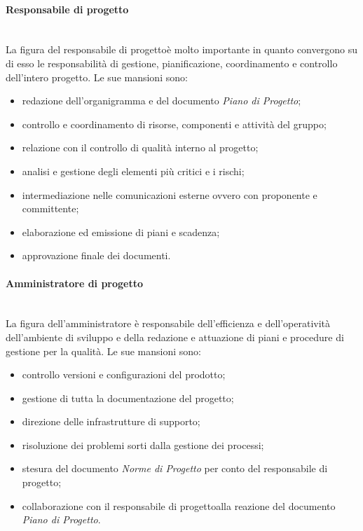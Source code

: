			\paragraph*{Responsabile di progetto}\mbox{}\\ [1mm]
				La figura del responsabile di progetto\glosp è molto importante in quanto convergono su di esso le responsabilità di gestione, pianificazione, coordinamento e controllo dell'intero progetto\glo.
				Le sue mansioni sono:
				\begin{itemize}
					\item redazione dell'organigramma e del documento \textit{Piano di Progetto};
					\item controllo e coordinamento di risorse, componenti e attività del gruppo;
					\item relazione con il controllo di qualità interno al progetto\glo;
					\item analisi e gestione degli elementi più critici e i rischi;
					\item intermediazione nelle comunicazioni esterne ovvero con proponente e committente;
					\item elaborazione ed emissione di piani e scadenza;
					\item approvazione finale dei documenti.
				\end{itemize}
			\paragraph*{Amministratore di progetto}\mbox{}\\ [1mm]
				La figura dell'amministratore è responsabile dell'efficienza e dell'operatività dell'ambiente di sviluppo e della redazione e attuazione di piani e procedure di gestione per la qualità.
				Le sue mansioni sono:
				\begin{itemize}
					\item controllo versioni e configurazioni del prodotto\glo;
					\item gestione di tutta la documentazione del progetto\glo;
					\item direzione delle infrastrutture di supporto;
					\item risoluzione dei problemi sorti dalla gestione dei processi\glo;
					\item stesura del documento \textit{Norme di Progetto} per conto del responsabile di progetto\glo;
					\item collaborazione con il responsabile di progetto\glo alla reazione del documento \textit{Piano di Progetto}.
				\end{itemize}
